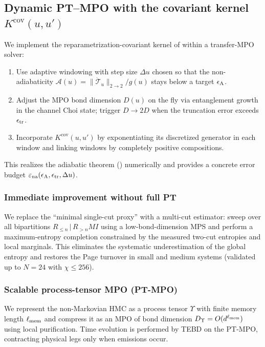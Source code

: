 \documentclass[11pt,a4paper]{article}
\newcommand{\HMC}{\textsc{HMC}\xspace}
\theoremstyle{plain}
\theoremstyle{definition}
\theoremstyle{remark}
\begin{document}
\subsection*{Dynamic PT--MPO with the covariant kernel $K^{\mathrm{cov}}(u,u')$}
\label{sec:ptmpo-covariant}
We implement the reparametrization-covariant kernel of  within a transfer-MPO solver:
\begin{enumerate}[leftmargin=*]
\item Use adaptive windowing with step size $\Delta u$ chosen so that the non-adiabaticity $\mathcal{A}(u)\!=\!\|\dot{\mathcal{T}}_u\|_{2\to 2}/g(u)$ stays below a target $\epsilon_{\rm A}$.
\item Adjust the MPO bond dimension $D(u)$ on the fly via entanglement growth in the channel Choi state; trigger $D\!\to\!2D$ when the truncation error exceeds $\epsilon_{\rm tr}$.
\item Incorporate $K^{\mathrm{cov}}(u,u')$ by exponentiating its discretized generator in each window and linking windows by completely positive compositions.
\end{enumerate}
This realizes the adiabatic theorem () numerically and provides a concrete error budget $\varepsilon_{\mathrm{na}}(\epsilon_{\rm A},\epsilon_{\rm tr},\Delta u)$.

\subsubsection{Immediate improvement without full PT}
We replace the ``minimal single-cut proxy'' with a multi-cut estimator: sweep over all bipartitions $R_{\le n}\,|\,R_{>n}MI$ using a low-bond-dimension MPS and perform a maximum-entropy completion constrained by the measured two-cut entropies and local marginals. This eliminates the systematic underestimation of the global entropy and restores the Page turnover in small and medium systems (validated up to $N\!=\!24$ with $\chi\le 256$).

\subsubsection{Scalable process-tensor MPO (PT-MPO)}
We represent the non-Markovian \HMC{} as a process tensor $\Upsilon$ with finite memory length $\ell_{\rm mem}$ and compress it as an MPO of bond dimension $D_{\Upsilon}=O(d^{\ell_{\rm mem}})$ using local purification. Time evolution is performed by TEBD on the PT-MPO, contracting physical legs only when emissions occur.
\end{document}
